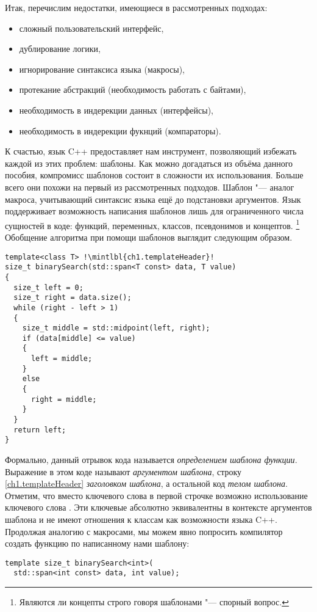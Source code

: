 Итак, перечислим недостатки, имеющиеся в рассмотренных подходах:
\begin{itemize}
\item сложный пользовательский интерфейс,
\item дублирование логики,
\item игнорирование синтаксиса языка (макросы),
\item протекание абстракций (необходимость работать с байтами),
\item необходимость в индерекции данных (интерфейсы),
\item необходимость в индерекции фукнций (компараторы).
\end{itemize}
К счастью, язык C++ предоставляет нам инструмент, позволяющий избежать каждой из этих проблем: шаблоны.
Как можно догадаться из объёма данного пособия, компромисс шаблонов состоит в сложности их использования.
Больше всего они похожи на первый из рассмотренных подходов.
Шаблон "--- аналог макроса, учитывающий синтаксис языка ещё до подстановки аргументов.
Язык поддерживает возможность написания шаблонов лишь для ограниченного числа сущностей в коде: функций, переменных, классов, псевдонимов и концептов.
\footnote{Являются ли концепты строго говоря шаблонами "--- спорный вопрос.}
Обобщение алгоритма  при помощи шаблонов выглядит следующим образом.
\begin{verbatim}
template<class T> !\mintlbl{ch1.templateHeader}!
size_t binarySearch(std::span<T const> data, T value)
{
  size_t left = 0;
  size_t right = data.size();
  while (right - left > 1)
  {
    size_t middle = std::midpoint(left, right);
    if (data[middle] <= value)
    {
      left = middle;
    }
    else
    {
      right = middle;
    }
  }
  return left;
}
\end{verbatim}
Формально, данный отрывок кода называется \textit{определением шаблона функции}.
Выражение  в этом коде называют \textit{аргументом шаблона}, строку \ref{ch1.templateHeader} \textit{заголовком шаблона}, а остальной код \textit{телом шаблона}.
Отметим, что вместо ключевого слова  в первой строчке возможно использование ключевого слова .
Эти ключевые абсолютно эквивалентны в контексте аргументов шаблона и не имеют отношения к классам как возможности языка C++.
Продолжая аналогию с макросами, мы можем явно попросить компилятор создать функцию по написанному нами шаблону:
\begin{verbatim}
template size_t binarySearch<int>(
  std::span<int const> data, int value);
\end{verbatim}

